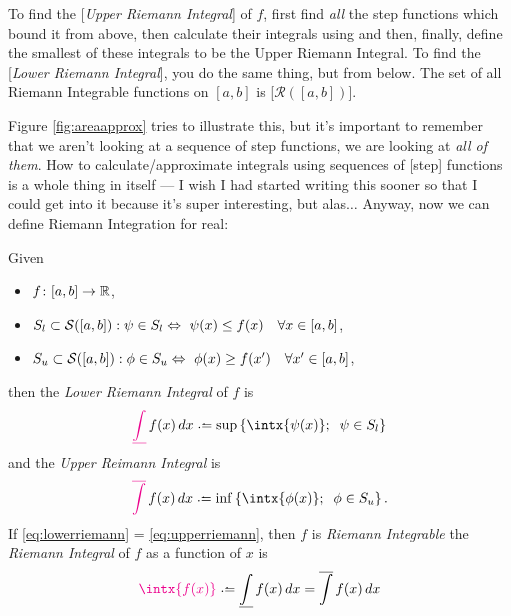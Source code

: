 \medskip
To find the [\emph{Upper Riemann Integral}] of $f$, first find \emph{all} the step functions which bound it from above, then calculate their integrals using  and then, finally, define the smallest of these integrals to be the Upper Riemann Integral. To find the [\emph{Lower Riemann Integral}], you do the same thing, but from below. The set of all Riemann Integrable functions on $[a,b]$ is [\emph{$\mathcal{R}([a, b])$}].

\medskip
Figure \ref{fig:areaapprox} tries to illustrate this, but it's important to remember that we aren't looking at a sequence of step functions, we are looking at \emph{all of them}. How to calculate/approximate integrals using sequences of [step] functions is a whole thing in itself --- I wish I had started writing this sooner so that I could get into it because it's super interesting, but alas$\ldots$ Anyway, now we can define Riemann Integration for real:

\begin{definition}\label{def:riemann}
	Given  
	\begin{itemize}
	\item
		$f\colon [a, b] \rightarrow \mathbb{R}$,
	\item
		$S_l \subset \mathcal{S}([a, b]) : \psi \in S_l \Leftrightarrow \ \psi(x) \leq f(x) \quad \forall x \in [a, b] $,
	\item
		$S_u \subset \mathcal{S}([a, b]) : \phi \in S_u \Leftrightarrow \ \phi(x) \geq f(x') \quad \forall x' \in [a, b] $,
	\end{itemize}
	then the {\color{Magenta}\emph{Lower Riemann Integral}} of $f$ is
	\begin{equation}
		{\color{Magenta}\underline {\int}} \, f(x) \, dx \defeq \sup \left\{\intx{\psi(x)}; \;\; \psi \in S_l\right\}
		\label{eq:lowerriemann}
	\end{equation} 
	and the {\color{Magenta}\emph{Upper Reimann Integral}} is
	\begin{equation}
		{\color{Magenta}\overline {\int}} \, f(x) \, dx \defeq \inf \left\{\intx{\phi(x)}; \;\; \phi \in S_u\right\}.
		\label{eq:upperriemann}
	\end{equation}
	If \eqref{eq:lowerriemann} = \eqref{eq:upperriemann}, then $f$ is {\color{Magenta}\emph{Riemann Integrable}} the {\color{Magenta}\emph{Riemann Integral}} of $f$ as a function of $x$ is 
	\begin{equation}
		{\color{Magenta}\intx{f(x)}} \defeq \underline {\int} \, f(x) \, dx = \overline {\int} \, f(x) \, dx
		\label{eq:riemann}
	\end{equation}
\end{definition}